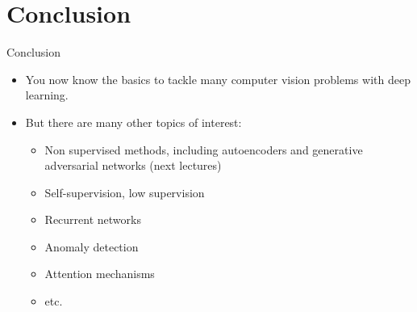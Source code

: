 \documentclass[xcolor=pdftex,dvipsnames,table,mathserif]{beamer}
\begin{document}










\section*{Conclusion}

\begin{frame}{Conclusion}

  \begin{block}{}
    \begin{itemize}
    \item You now know the basics to tackle many computer vision problems with deep learning.
    \item But there are many other topics of interest:
      \begin{itemize}
      \item Non supervised methods, including autoencoders and generative adversarial networks (next lectures)
      \item Self-supervision, low supervision
      \item Recurrent networks
      \item Anomaly detection
      \item Attention mechanisms
      \item etc.
      \end{itemize}
    \end{itemize}
  \end{block}

\end{frame}
\end{document}
